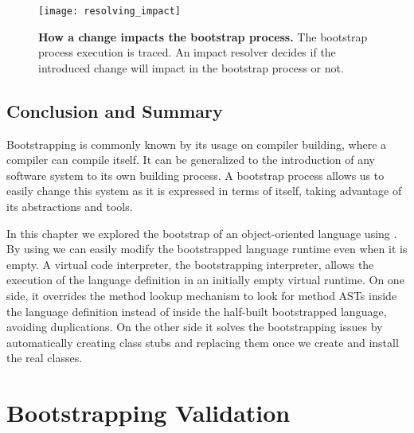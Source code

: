\begin{figure}[ht]
\center
\texttt{[image: resolving\_impact]}
\caption{\textbf{How a change impacts the bootstrap process.} The bootstrap process execution is traced. An impact resolver decides if the introduced change will impact in the bootstrap process or not.\label{fig:resolving_impact}}
\end{figure}

\section{Conclusion and Summary}

Bootstrapping is commonly known by its usage on compiler building, where a compiler can compile itself.
It can be generalized to the introduction of any software system to its own building process.
A bootstrap process allows us to easily change this system as it is expressed in terms of itself, taking advantage of its abstractions and tools.

In this chapter we explored the bootstrap of an object-oriented language using \Vtt. By using \Vtt we can easily modify the bootstrapped language runtime even when it is empty. A virtual code interpreter, the bootstrapping interpreter, allows the execution of the language definition in an initially empty virtual runtime. On one side, it overrides the method lookup mechanism to look for method ASTs inside the language definition instead of inside the half-built bootstrapped language, avoiding duplications. On the other side it solves the bootstrapping issues by automatically creating class stubs and replacing them once we create and install the real classes.
%

\chapter{Bootstrapping Validation} \label{sec:bootstrapping_validation}
\minitoc
\introduction


